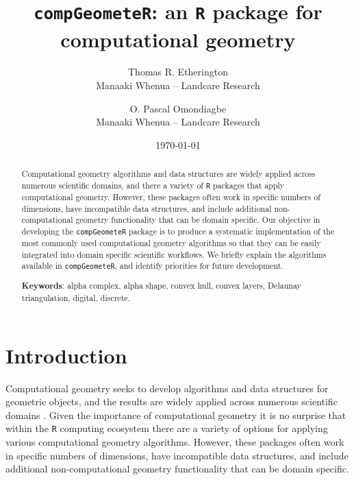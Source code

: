 \documentclass[12pt, a4paper]{article}
\begin{document}
\title{\texttt{compGeometeR}: an \texttt{R} package for computational geometry}

\author{Thomas R. Etherington  \\
	Manaaki Whenua -- Landcare Research  \\
	\and 
	O. Pascal Omondiagbe \\
	Manaaki Whenua -- Landcare Research \\
	}



\date{\today}



\maketitle


\begin{abstract}

Computational geometry algorithms and data structures are widely applied across numerous scientific domains, and there a variety of \texttt{R} packages that apply computational geometry.  However, these packages often work in specific numbers of dimensions, have incompatible data structures, and include additional non-computational geometry functionality that can be domain specific.  Our objective in developing the \texttt{compGeometeR} package is to produce a systematic implementation of the most commonly used computational geometry algorithms so that they can be easily integrated into domain specific scientific workflows.  We briefly explain the algorithms available in \texttt{compGeometeR}, and identify priorities for future development.

\begin{center}
\textbf{Keywords}: alpha complex, alpha shape, convex hull, convex layers, Delaunay triangulation, digital, discrete.
\end{center}

\end{abstract}

\section{Introduction}

Computational geometry seeks to develop algorithms and data structures for geometric objects, and the results are widely applied across numerous scientific domains \citep{de-berg-2008}.  Given the importance of computational geometry it is no surprise that within the \texttt{R} computing ecosystem there are a variety of options for applying various computational geometry algorithms.  However, these packages often work in specific numbers of dimensions, have incompatible data structures, and include additional non-computational geometry functionality that can be domain specific.
\end{document}
